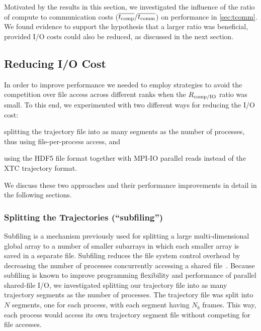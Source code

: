 Motivated by the results in this section, we investigated the influence of the ratio of compute to communication costs ($\overline{{t}_{\text{comp}}}/\overline{t_{\text{comm}}}$) on performance in \ref{sec:tcomm}.
We found evidence to support the hypothesis that a larger ratio was beneficial, provided I/O costs could also be reduced, as discussed in the next section.

\subsection{Reducing I/O Cost}
\label{sec:I/O}
In order to improve performance we needed to employ strategies to avoid the competition over file access across different ranks when the $R_{\text{comp/IO}}$ ratio was small.
To this end, we experimented with two different ways for reducing the I/O cost:
\begin{inparaenum}[1)]
	\item splitting the trajectory file into as many segments as the number of processes, thus using file-per-process access, and
	\item using the HDF5 file format together with MPI-IO parallel reads instead of the XTC trajectory format.
\end{inparaenum}
We discuss these two approaches and their performance improvements in detail in the following sections.

\subsubsection{Splitting the Trajectories (``subfiling'')}
\label{splitting-traj}
Subfiling is a mechanism previously used for splitting a large multi-dimensional global array to a number of smaller subarrays in which each smaller array is saved in a separate file. Subfiling reduces the file system control overhead by decreasing the number of processes concurrently accessing a shared file~\cite{scalable-IO, scalable-IO1}.
Because subfiling is known to improve programming flexibility and performance of parallel shared-file I/O, we investigated splitting our trajectory file into as many trajectory segments as the number of processes.
The trajectory file was split into $N$ segments, one for each process, with each segment having $N_{b}$ frames. 
This way, each process would access its own trajectory segment file without competing for file accesses. 

